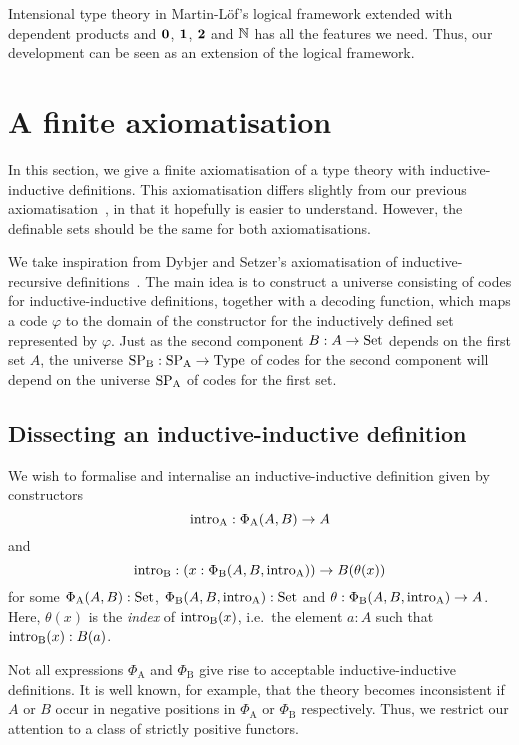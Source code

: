 \documentclass{article}
\begin{document}
Intensional type theory in Martin-L\"of's logical framework extended with
dependent products and $\mathbf{0}$, $\mathbf{1}$, $\mathbf{2}$ and $\mathbb{N}$ has all the features we
need. Thus, our development can be seen as an extension of
the logical framework.

\section{A finite axiomatisation}
\label{sec:axiomatisation}
 

In this section, we give a finite axiomatisation of a type theory with
inductive-inductive definitions. This axiomatisation differs slightly
from our previous
axiomatisation~\cite{nordvallforsbergSetzer2010indind}, in that it
hopefully is easier to understand. However, the definable sets should
be the same for both axiomatisations.


We take inspiration from Dybjer and Setzer's axiomatisation of
inductive-recursive definitions~\cite{dybjersetzer1999finax}. The main
idea is to construct a universe consisting of codes for
inductive-inductive definitions, together with a decoding function,
which maps a code $\varphi$ to the domain of the constructor for the
inductively defined set represented by $\varphi$.  Just as the second
component $B : A \to \text{Set}$ depends on the first set $A$, the universe $\text{SP}_{\mathrm{B}} : \text{SP}_{\mathrm{A}} \to \text{Type}$
of codes for the second component will depend on the universe $\text{SP}_{\mathrm{A}}$ of codes
for the first set.

\subsection{Dissecting an inductive-inductive definition}
\label{sec:dissect-ind}

We wish to formalise and internalise an inductive-inductive definition
given by constructors
\[
\text{intro}_{\mathrm{A}} : \Phi_{\mathrm{A}}(A, B) \to A
\]
and
\[
\text{intro}_{\mathrm{B}} : (x : \Phi_{\mathrm{B}}(A, B, \text{intro}_{\mathrm{A}})) \to B(\theta(x))
\]
for some $\Phi_{\mathrm{A}}(A, B) : \text{Set}$, $\Phi_{\mathrm{B}}(A, B,
\text{intro}_{\mathrm{A}}) : \text{Set}$ and $\theta : \Phi_{\mathrm{B}}(A, B, \text{intro}_{\mathrm{A}}) \to
A$.
Here, $\theta(x)$ is the \emph{index} of $\text{intro}_{\mathrm{B}}(x)$, i.e.\ the element $a :
A$ such that $\text{intro}_{\mathrm{B}}(x) : B(a)$.

Not all expressions $\Phi_{\mathrm{A}}$ and $\Phi_{\mathrm{B}}$ give
rise to acceptable inductive-inductive definitions. It is well known,
for example, that the theory becomes inconsistent if $A$ or $B$ occur
in negative positions in $\Phi_{\mathrm{A}}$ or $\Phi_{\mathrm{B}}$
respectively. Thus, we restrict our attention to a class of strictly
positive functors.
\end{document}
